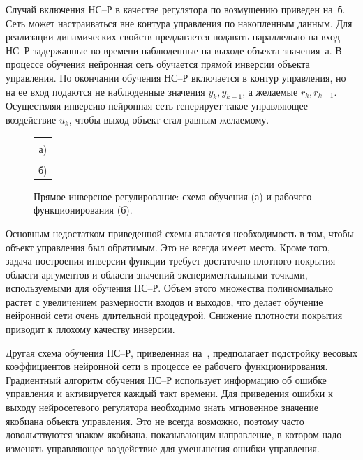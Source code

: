 \label{direct_inv_nnc}

Случай включения НС--Р в качестве регулятора по возмущению приведен
на~б.  Сеть может настраиваться вне контура
управления по накопленным данным.  Для реализации динамических свойств
предлагается подавать параллельно на вход НС--Р задержанные во времени
наблюденные на выходе объекта значения~а.  В
процессе обучения нейронная сеть обучается прямой инверсии объекта
управления.  По окончании обучения НС--Р включается в контур
управления, но на ее вход подаются не наблюденные значения
$y_k,y_{k-1}$, а желаемые $r_k,r_{k-1}$.  Осуществляя инверсию
нейронная сеть генерирует такое управляющее воздействие $u_k$, чтобы
выход объект стал равным желаемому.

\begin{figure}[h]
\centering
\begin{tabular}{c}
\hbox{} \\
а) \\
\hbox{} \\
б)\\
\end{tabular}
\caption{Прямое инверсное регулирование: схема обучения (а)
         и рабочего функционирования (б).}
\label{fig:direct_nnc}
\end{figure}

Основным недостатком приведенной схемы является необходимость в том,
чтобы объект управления был обратимым.  Это не всегда имеет место.
Кроме того, задача построения инверсии функции требует достаточно
плотного покрытия области аргументов и области значений
экспериментальными точками, используемыми для обучения НС--Р.  Объем
этого множества полиномиально растет с увеличением размерности входов
и выходов, что делает обучение нейронной сети очень длительной
процедурой.  Снижение плотности покрытия приводит к плохому качеству
инверсии.


Другая схема обучения НС--Р, приведенная на~,
предполагает подстройку весовых коэффициентов нейронной сети в
процессе ее рабочего функционирования.  Градиентный алгоритм обучения
НС--Р использует информацию об ошибке управления и активируется каждый
такт времени.  Для приведения ошибки к выходу нейросетевого регулятора
необходимо знать мгновенное значение якобиана объекта управления.  Это
не всегда возможно, поэтому часто довольствуются знаком якобиана,
показывающим направление, в котором надо изменять управляющее
воздействие для уменьшения ошибки управления.

